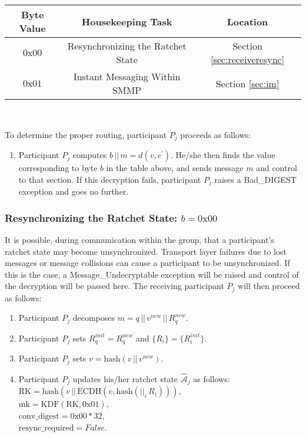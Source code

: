 \documentclass[%
preprint,
amsmath,amssymb,
aps,
prb,
floatfix,
]{revtex4-1}
\begin{document}
\begin{centering}
\begin{tabular}{|c|c|c|}
\hline
Byte Value & Housekeeping Task & Location \\
\hline
$0\mathrm{x}00$ & Resynchronizing the Ratchet State  & Section \ref{sec:receiveresync}\\
$0\mathrm{x}01$ & Instant Messaging Within SMMP & Section \ref{sec:im}\\
\hline
\end{tabular} \\
\end{centering}
\bigskip
To determine the proper routing, participant $P_j$ proceeds as follows:
\begin{enumerate}
\item Participant $P_j$ computes $b \, || \, m = d(v, c^\prime)$. He/she then
finds the value corresponding to byte $b$ in the table above, and sends message
$m$ and control to that section.
If this decryption fails, participant $P_j$ raises a Bad\_DIGEST exception and
goes no further.
\end{enumerate}
\subsubsection{\label{sec:receiveresync}Resynchronizing the Ratchet State: $b =
0\mathrm{x}00$}
It is possible, during communication within the group, that a participant's
ratchet state may become unsynchronized. Transport layer failures due to lost
messages or message collisions can cause a participant to be unsynchronized. If
this is the case, a Message\_Undecryptable exception will be raised
and control of the decryption will be passed here. The receiving participant
$P_j$ will then proceed as follows:
\begin{enumerate}
\item Participant $P_j$ decomposes $m = q \, || \, v^{new} \, || \, R_q^{new}$.
\item Participant $P_j$ sets $R_q^{init} = R_q^{new}$ and $\{R_i\} =
\{R_i^{init}\}$.
\item Participant $P_j$ sets $v = \mathrm{hash}(v \, || \, v^{new})$.
\item Participant $P_j$ updates his/her ratchet state
$\mathcal{\hat{A}}_j$ as follows:\\
$\mathrm{RK} = \mathrm{hash}(v \, || \, \mathrm{ECDH}(v, \mathrm{hash}(||_i
\, R_i)))$, \\
$\mathrm{mk} = \mathrm{KDF}(\mathrm{RK}, 0\mathrm{x}01)$, \\
$\mathrm{conv\_digest} = 0\mathrm{x}00 * 32$, \\
$\mathrm{resync\_required} = False$.
\end{enumerate}
\end{document}
